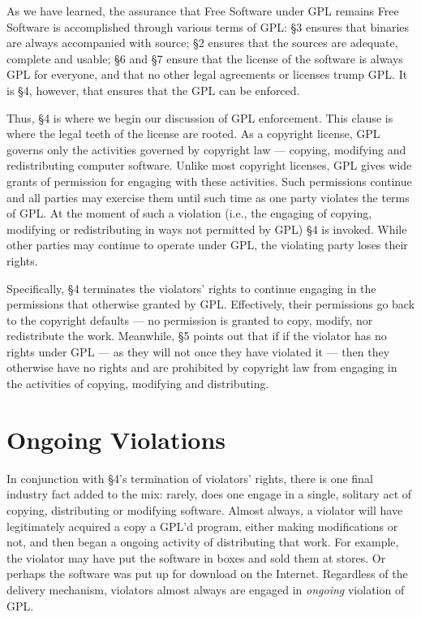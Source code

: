 \documentclass[12pt]{report}
\begin{document}
As we have learned, the assurance that Free Software under GPL remains
Free Software is accomplished through various terms of GPL: \S 3 ensures
that binaries are always accompanied with source; \S 2 ensures that the
sources are adequate, complete and usable; \S 6 and \S 7 ensure that the
license of the software is always GPL for everyone, and that no other
legal agreements or licenses trump GPL.  It is \S 4, however, that ensures
that the GPL can be enforced.

Thus, \S 4 is where we begin our discussion of GPL enforcement.  This
clause is where the legal teeth of the license are rooted.  As a copyright
license, GPL governs only the activities governed by copyright law ---
copying, modifying and redistributing computer software.  Unlike most
copyright licenses, GPL gives wide grants of permission for engaging with
these activities.  Such permissions continue and all parties may exercise
them until such time as one party violates the terms of GPL\@.  At the
moment of such a violation (i.e., the engaging of copying, modifying or
redistributing in ways not permitted by GPL) \S 4 is invoked.  While other
parties may continue to operate under GPL, the violating party loses their
rights.

Specifically, \S 4 terminates the violators' rights to continue engaging
in the permissions that otherwise granted by GPL\@.  Effectively, their
permissions go back to the copyright defaults --- no permission is granted
to copy, modify, nor redistribute the work.  Meanwhile, \S 5 points out
that if if the violator has no rights under GPL --- as they will not once
they have violated it --- then they otherwise have no rights and are
prohibited by copyright law from engaging in the activities of copying,
modifying and distributing.

\section{Ongoing Violations}

In conjunction with \S 4's termination of violators' rights, there is one
final industry fact added to the mix: rarely, does one engage in a single,
solitary act of copying, distributing or modifying software.  Almost
always, a violator will have legitimately acquired a copy a GPL'd program,
either making modifications or not, and then began a ongoing activity of
distributing that work.  For example, the violator may have put the
software in boxes and sold them at stores.  Or perhaps the software was
put up for download on the Internet.  Regardless of the delivery
mechanism, violators almost always are engaged in {\em ongoing\/}
violation of GPL\@.
\end{document}
